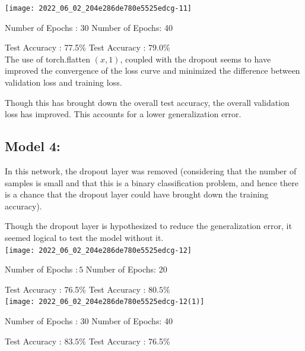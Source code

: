 \documentclass[10pt]{article}
\begin{document}
\texttt{[image: 2022\_06\_02\_204e286de780e5525edcg-11]}

Number of Epochs : 30 \hspace{19em} Number of Epochs: 40

Test Accuracy : 77.5\% \hspace{19em} Test Accuracy : 79.0\% \\

The use of torch.flatten $(x, 1)$, coupled with the dropout seems to have improved the convergence of the loss curve and minimized the difference between validation loss and training loss.

Though this has brought down the overall test accuracy, the overall validation loss has improved. This accounts for a lower generalization error.

\subsection{Model 4:}
\vspace{-\lineskip}
\newline



In this network, the dropout layer was removed (considering that the number of samples is small and that this is a binary classification problem, and hence there is a chance that the dropout layer could have brought down the training accuracy).

Though the dropout layer is hypothesized to reduce the generalization error, it seemed logical to test the model without it.\\

\texttt{[image: 2022\_06\_02\_204e286de780e5525edcg-12]}

Number of Epochs $: 5$  \hspace{19em}  Number of Epochs: 20

Test Accuracy : 76.5\%  \hspace{19em}  Test Accuracy : $80.5 \%$\\



\texttt{[image: 2022\_06\_02\_204e286de780e5525edcg-12(1)]}

Number of Epochs : 30  \hspace{19em}  Number of Epochs: 40

Test Accuracy : $83.5 \%$  \hspace{19em} Test Accuracy : 76.5\% \\
\end{document}
